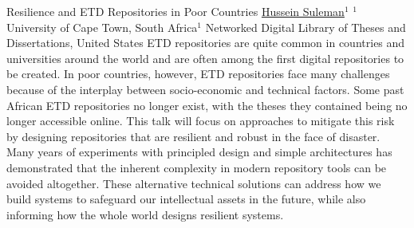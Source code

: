 
    \begin{abstract_online}{Resilience and ETD Repositories in Poor Countries}{%
        \underline{Hussein Suleman}$^{1}$}{%
        }{%
        $^1$ University of Cape Town, South Africa\newline{}$^1$ Networked Digital Library of Theses and Dissertations, United States}
        ETD repositories are quite common in countries and universities around the world and are often among the first digital repositories to be created.  In poor countries, however, ETD repositories face many challenges because of the interplay between socio-economic and technical factors.  Some past African ETD repositories no longer exist, with the theses they contained being no longer accessible online.  This talk will focus on approaches to mitigate this risk by designing repositories that are resilient and robust in the face of disaster.  Many years of experiments with principled design and simple architectures has demonstrated that the inherent complexity in modern repository tools can be avoided altogether.  These alternative technical solutions can address how we build systems to safeguard our intellectual assets in the future, while also informing how the whole world designs resilient systems.
    
    \end{abstract_online}
    
